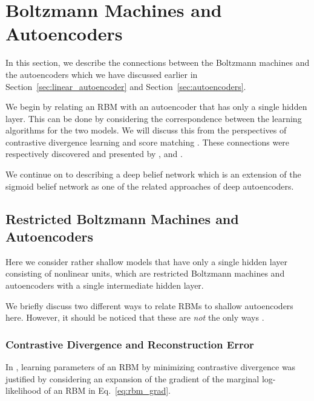\documentclass[dissertation,nocontribution]{aaltoseries}
\begin{document}
\section{Boltzmann Machines and Autoencoders}
\label{sec:bm_aenc}

In this section, we describe the connections between
the Boltzmann machines and the autoencoders which we have
discussed earlier in Section~\ref{sec:linear_autoencoder}
and Section~\ref{sec:autoencoders}.

We begin by relating an RBM with an autoencoder that has
only a single hidden layer. This can be done by considering
the correspondence between the learning algorithms for the
two models. We will discuss this from the perspectives of contrastive
divergence learning and score matching
\citep{Hyvarinen2005}. These connections were respectively
discovered and presented by \citet{Bengio2009},
\citet{Swersky2011} and \citet{Vincent2011}.

We continue on to describing a deep belief network
\citep{Hinton2006nc} which is an extension of the sigmoid belief
network 
as one of
the related approaches of deep autoencoders. 

\subsection{Restricted Boltzmann Machines and Autoencoders}
\label{sec:rbm_aenc}

Here we consider rather shallow models that have only a
single hidden layer consisting of nonlinear units, which are
restricted Boltzmann machines and autoencoders with a single
intermediate hidden layer. 

We briefly discuss two different ways to relate RBMs to
shallow autoencoders here. However, it should be noticed
that these are \textit{not} the only ways \citep[see,
e.g.,][for another interpretation that unifies RBMs and
autoencoders]{Ranzato2007a}.

\subsubsection{Contrastive Divergence and Reconstruction Error}
\label{sec:cd_rerr}

In \citep{Bengio2009}, learning parameters of an RBM by
minimizing contrastive divergence was justified by
considering an expansion of the gradient of the marginal
log-likelihood of an RBM in Eq.~\eqref{eq:rbm_grad}. 
\end{document}
